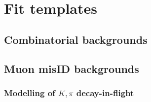 \section{Fit templates}


\subsection{Combinatorial backgrounds}
\label{ref:fit:tmpl:comb}


\subsection{Muon misID backgrounds}
\label{ref:fit:tmpl:misid}


\subsubsection{Modelling of $K, \pi$ decay-in-flight}
\label{ref:fit:tmpl:misid:dif}
